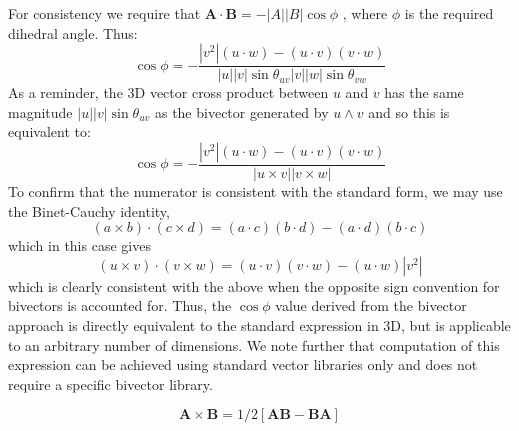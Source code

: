 \documentclass[11pt]{article} %
\begin{document}
For consistency we require that $\mathbf{A} \cdot \mathbf{B} = -|A| |B| \cos \phi$ , where $\phi$ is the required dihedral angle. Thus:
\begin{equation}
\cos \phi =- \frac{  |v^2| (u \cdot w  ) -  (u \cdot v ) ( v \cdot w)      }{ |u| |v| \sin \theta_{uv}   |v| |w| \sin \theta_{vw}  } 
\end{equation}
As a reminder, the 3D vector cross product between $u$ and $v$ has the same magnitude $|u| |v| \sin \theta_{uv}$ as the bivector generated by $u \wedge v$ and so this is equivalent to:
\begin{equation}
\cos \phi = - \frac{  |v^2| (u \cdot w  ) -  (u \cdot v ) ( v \cdot w)      }{| u \times v| |v \times w|  } 
\end{equation}
To confirm that the numerator is consistent with the standard form, we may use the Binet-Cauchy identity,
\begin{equation}
(a \times b) \cdot (c \times d) = (a \cdot c)(b \cdot d) - (a \cdot d)(b \cdot c)
\end{equation}
which in this case gives
\begin{equation}
(u \times v) \cdot (v \times w) = (u \cdot v)(v \cdot w) - (u \cdot w)|v^2| 
\end{equation}
which is clearly consistent with the above when the opposite sign convention for bivectors is accounted for. Thus, the $\cos \phi$ value derived from the bivector approach is directly equivalent to the standard expression in 3D, but is applicable to an arbitrary number of dimensions. We note further that computation of this expression can be achieved using standard vector libraries only and does not require a specific bivector library. 


\begin{equation}
\mathbf{A} \times \mathbf{B} = 1/2 [ \mathbf{AB} - \mathbf{BA} ]
\end{equation}
\end{document}
